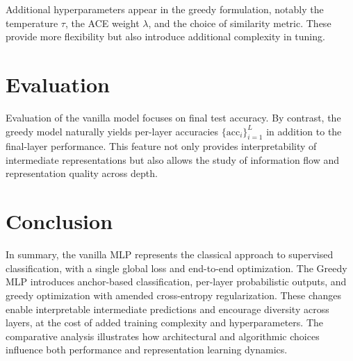 \documentclass[11pt]{article}
\begin{document}
Additional hyperparameters appear in the greedy formulation, notably the temperature $\tau$, the ACE weight $\lambda$, and the choice of similarity metric. These provide more flexibility but also introduce additional complexity in tuning.

\section{Evaluation}
Evaluation of the vanilla model focuses on final test accuracy. By contrast, the greedy model naturally yields per-layer accuracies $\{\mathrm{acc}_i\}_{i=1}^L$ in addition to the final-layer performance. This feature not only provides interpretability of intermediate representations but also allows the study of information flow and representation quality across depth.

\section{Conclusion}
In summary, the vanilla MLP represents the classical approach to supervised classification, with a single global loss and end-to-end optimization. The Greedy MLP introduces anchor-based classification, per-layer probabilistic outputs, and greedy optimization with amended cross-entropy regularization. These changes enable interpretable intermediate predictions and encourage diversity across layers, at the cost of added training complexity and hyperparameters. The comparative analysis illustrates how architectural and algorithmic choices influence both performance and representation learning dynamics.
\end{document}
